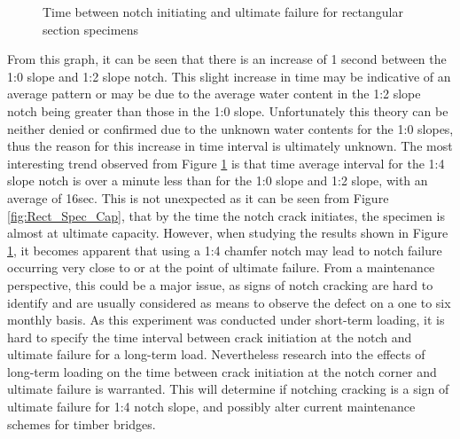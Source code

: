 \documentclass[11pt,a4paper]{article}
\numberwithin{equation}{subsection}
\begin{document}
\vspace*{\baselineskip}

\begin{figure}[h]
	\begin{center}
	\end{center}
	\caption{Time between notch initiating and ultimate failure for rectangular section specimens}
	\label{fig:Rect_Time}
\end{figure}

\noindent
From this graph, it can be seen that there is an increase of 1 second between the 1:0 slope and 1:2 slope notch. This slight increase in time may be indicative of an average pattern or may be due to the average water content in the 1:2 slope notch being greater than those in the 1:0 slope. Unfortunately this theory can be neither denied or confirmed due to the unknown water contents for the 1:0 slopes, thus the reason for this increase in time interval is ultimately unknown. The most interesting trend observed from Figure \ref{fig:Rect_Time} is that time average interval for the 1:4 slope notch is over a minute less than for the 1:0 slope and 1:2 slope, with an average of 16sec. This is not unexpected as it can be seen from Figure \ref{fig:Rect_Spec_Cap}, that by the time the notch crack initiates, the specimen is almost at ultimate capacity. However, when studying the results shown in Figure \ref{fig:Rect_Time}, it becomes apparent that using a 1:4 chamfer notch may lead to notch failure occurring very close to or at the point of ultimate failure. From a maintenance perspective, this could be a major issue, as signs of notch cracking are hard to identify and are usually considered as means to observe the defect on a one to six monthly basis. As this experiment was conducted under short-term loading, it is hard to specify the time interval between crack initiation at the notch and ultimate failure for a long-term load. Nevertheless research into the effects of long-term loading on the time between crack initiation at the notch corner and ultimate failure is warranted. This will determine if notching cracking is a sign of ultimate failure for 1:4 notch slope, and possibly alter current maintenance schemes for timber bridges.
\end{document}
